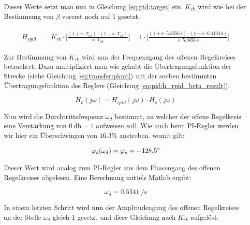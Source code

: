 Dieser Werte setzt man nun in Gleichung \ref{eq:pid:target} ein. $K_{rk}$ wird
wie bei der Bestimmung von $\beta$ vorerst noch auf 1 gesetzt.

\begin{gather} \label{eq:pid:h_rpid_beta_result}
    \begin{split}
        H_{rpid} & = K_{rk} \cdot \biggl[ \frac{(1 + s \cdot T_{nk}               ) \cdot (1 + s \cdot T_{vk}               ) }{ s \cdot T_{nk}               } \biggr]
                   = 1      \cdot \biggl[ \frac{(1 + s \cdot \SI{5.3656}{\second} ) \cdot (1 + s \cdot \SI{0.4134}{\second} ) }{ s \cdot \SI{5.3656}{\second} } \biggr]
    \end{split}
\end{gather}

Zur  Bestimmung   von  $K_{rk}$   wird  nun   der  Frequenzgang   des  offenen
Regelkreises    betrachtet. Dazu   multipliziert    man    wie   gehabt    die
\"Ubertragungsfunktion der  Strecke (siehe  Gleichung \ref{eq:transfer:plant})
mit  der  soeben  bestimmten  \"Ubertragungsfunktion  des  Reglers  (Gleichung
\ref{eq:pid:h_rpid_beta_result}).

\begin{equation} \label{eq:pid:h_o_k_rk_one}
    H_{o}(j\omega) = H_{rpid}(j\omega) \cdot H_s(j\omega)
\end{equation}

Nun wird  die Durchtrittsfrequenz $\omega_d$  bestimmt, an welcher  der offene
Regelkreis eine  Verst\"arkung von $\SI{0}{\decibel} =  1$ aufweisen soll. Wie
auch  beim  PI-Regler  werden  wir   hier  ein  \"Uberschwingen  von  $16.3\%$
anstreben, womit gilt:

\begin{equation} \label{eq:pid:omega_d_target}
    \varphi_s(\omega_d) = \varphi_s = -128.5\degree
\end{equation}

Dieser Wert wird analog zum PI-Regler aus dem Phasengang des offenen Regelkreises
abgelesen.  Eine Berechnung mittels Matlab ergibt:


\begin{equation} \label{eq:pid:omega_d_target}
    \omega_d = \SI{0.5341}{\per\second}
\end{equation}

In einem letzten Schritt wird  nun der Amplitudengang des offenen Regelkreises
an der  Stelle $\omega_d$ gleich 1  gesetzt und diese Gleichung  nach $K_{rk}$
aufgel\"ost:


